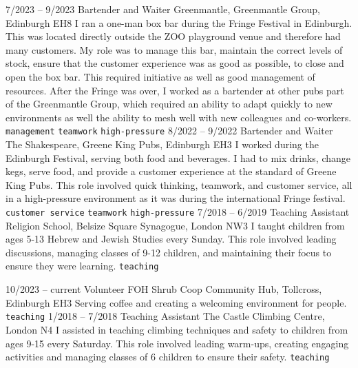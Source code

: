 \documentclass[9pt]{developercv} %
\begin{document}
\vspace{-10 pt}
\begin{entrylist}
	\entry
        {7/2023 --  9/2023}
		{Bartender and Waiter}
		{Greenmantle, Greenmantle Group, Edinburgh EH8}
		{
			I ran a one-man box bar during the Fringe Festival in Edinburgh. 
			This was located directly outside the ZOO playground venue and therefore had many customers.
			My role was to manage this bar, maintain the correct levels of stock, ensure that the customer experience was as good as possible, to close and open the box bar.
			This required initiative as well as good management of resources.
			After the Fringe was over, I worked as a bartender at other pubs part of the Greenmantle Group, which required an ability to adapt quickly to new environments as well the ability to mesh well with new colleagues and co-workers.
        	\newline
			\texttt{management} \slashsep \texttt{teamwork} \slashsep \texttt{high-pressure}
		}
	\entry
		{8/2022 -- 9/2022}
		{Bartender and Waiter}
		{The Shakespeare, Greene King Pubs, Edinburgh EH3}
		{
			I worked during the Edinburgh Festival, serving both food and beverages.
			I had to mix drinks, change kegs, serve food, and provide a customer experience at the standard of Greene King Pubs.
			This role involved quick thinking, teamwork, and customer service, all in a high-pressure environment as it was during the international Fringe festival.
			\newline
			\texttt{customer service} \slashsep \texttt{teamwork} \slashsep \texttt{high-pressure}
		}
	\entry
		{7/2018 -- 6/2019}
		{Teaching Assistant}
		{Religion School, Belsize Square Synagogue, London NW3}
		{
			I taught children from ages 5-13 Hebrew and Jewish Studies every Sunday.
			This role involved leading discussions, managing classes of 9-12 children, and maintaining their focus to ensure they were learning.
			\newline
			\texttt{teaching}
		}
\end{entrylist}

\vspace{-10 pt}
\begin{entrylist}
	\entry
		{10/2023 -- current}
		{Volunteer FOH}
		{Shrub Coop Community Hub, Tollcross, Edinburgh EH3}
		{
			Serving coffee and creating a welcoming environment for people.
			\newline
			\texttt{teaching}
		}
	\entry
		{1/2018 -- 7/2018}
		{Teaching Assistant}
		{The Castle Climbing Centre, London N4}
		{
			I assisted in teaching climbing techniques and safety to children from ages 9-15 every Saturday.
			This role involved leading warm-ups, creating engaging activities and managing classes of 6 children to ensure their safety.
			\newline
			\texttt{teaching}
		}
\end{entrylist}
\end{document}
